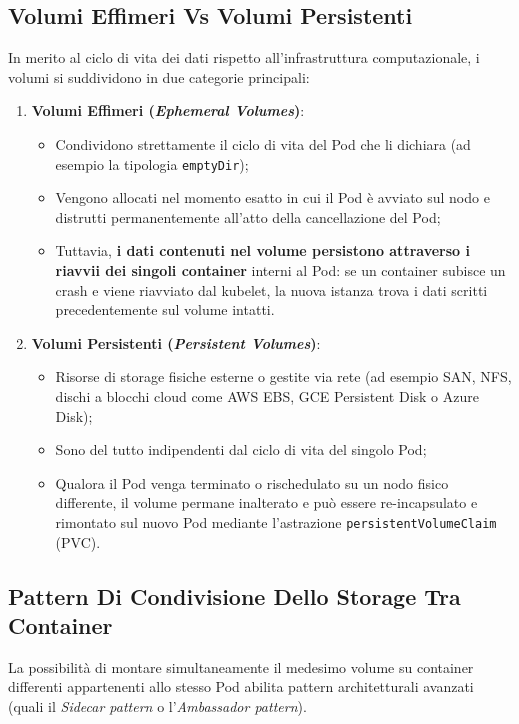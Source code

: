\documentclass[11pt, a4paper]{article}
\begin{document}
\subsection{Volumi Effimeri Vs Volumi Persistenti}
In merito al ciclo di vita dei dati rispetto all'infrastruttura computazionale, i volumi si suddividono in due categorie principali:
\begin{enumerate}[noitemsep]
    \item \textbf{Volumi Effimeri (\emph{Ephemeral Volumes})}:
    \begin{itemize}[noitemsep]
        \item Condividono strettamente il ciclo di vita del Pod che li dichiara (ad esempio la tipologia \texttt{emptyDir});
        \item Vengono allocati nel momento esatto in cui il Pod è avviato sul nodo e distrutti permanentemente all'atto della cancellazione del Pod;
        \item Tuttavia, \textbf{i dati contenuti nel volume persistono attraverso i riavvii dei singoli container} interni al Pod: se un container subisce un crash e viene riavviato dal kubelet, la nuova istanza trova i dati scritti precedentemente sul volume intatti.
    \end{itemize}
    \item \textbf{Volumi Persistenti (\emph{Persistent Volumes})}:
    \begin{itemize}[noitemsep]
        \item Risorse di storage fisiche esterne o gestite via rete (ad esempio SAN, NFS, dischi a blocchi cloud come AWS EBS, GCE Persistent Disk o Azure Disk);
        \item Sono del tutto indipendenti dal ciclo di vita del singolo Pod;
        \item Qualora il Pod venga terminato o rischedulato su un nodo fisico differente, il volume permane inalterato e può essere re-incapsulato e rimontato sul nuovo Pod mediante l'astrazione \texttt{persistentVolumeClaim} (PVC).
    \end{itemize}
\end{enumerate}

\subsection{Pattern Di Condivisione Dello Storage Tra Container}
La possibilità di montare simultaneamente il medesimo volume su container differenti appartenenti allo stesso Pod abilita pattern architetturali avanzati (quali il \emph{Sidecar pattern} o l'\emph{Ambassador pattern}).
\end{document}
